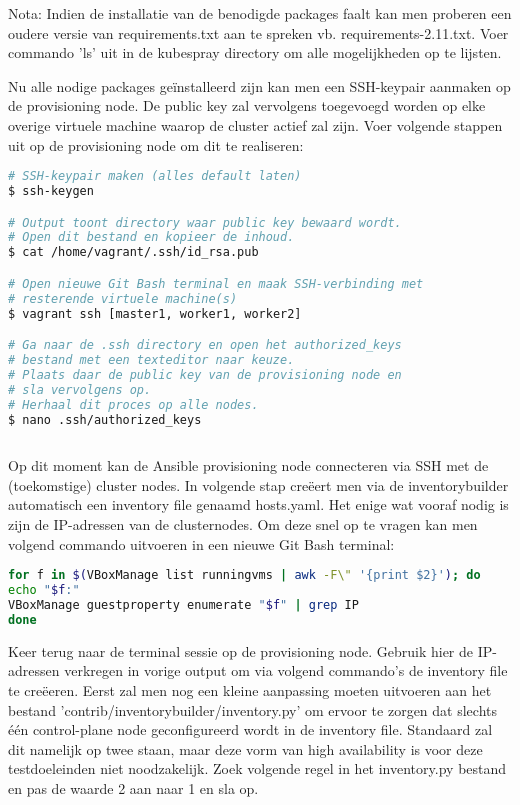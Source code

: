 Nota: Indien de installatie van de benodigde packages faalt kan men proberen een oudere versie van requirements.txt aan te spreken vb. requirements-2.11.txt. Voer commando 'ls' uit in de kubespray directory om alle mogelijkheden op te lijsten.

Nu alle nodige packages geïnstalleerd zijn kan men een SSH-keypair aanmaken op de provisioning node. De public key zal vervolgens toegevoegd worden op elke overige virtuele machine waarop de cluster actief zal zijn. Voer volgende stappen uit op de provisioning node om dit te realiseren:

\begin{lstlisting}[language=bash]
# SSH-keypair maken (alles default laten)
$ ssh-keygen

# Output toont directory waar public key bewaard wordt.
# Open dit bestand en kopieer de inhoud.
$ cat /home/vagrant/.ssh/id_rsa.pub

# Open nieuwe Git Bash terminal en maak SSH-verbinding met 
# resterende virtuele machine(s)
$ vagrant ssh [master1, worker1, worker2]

# Ga naar de .ssh directory en open het authorized_keys 
# bestand met een texteditor naar keuze. 
# Plaats daar de public key van de provisioning node en 
# sla vervolgens op.
# Herhaal dit proces op alle nodes.
$ nano .ssh/authorized_keys
    
\end{lstlisting} 

Op dit moment kan de Ansible provisioning node connecteren via SSH met de (toekomstige) cluster nodes. In volgende stap creëert men via de inventory\textunderscore builder automatisch een inventory file genaamd hosts.yaml. Het enige wat vooraf nodig is zijn de IP-adressen van de clusternodes. Om deze snel op te vragen kan men volgend commando uitvoeren in een nieuwe Git Bash terminal:

\begin{lstlisting}[language=bash] 
for f in $(VBoxManage list runningvms | awk -F\" '{print $2}'); do
echo "$f:"
VBoxManage guestproperty enumerate "$f" | grep IP
done
\end{lstlisting}  

Keer terug naar de terminal sessie op de provisioning node. Gebruik hier de IP-adressen verkregen in vorige output om via volgend commando's de inventory file te creëeren. 
Eerst zal men nog een kleine aanpassing moeten uitvoeren aan het bestand 'contrib/inventory\textunderscore builder/inventory.py' om ervoor te zorgen dat slechts één control-plane node geconfigureerd wordt in de inventory file. Standaard zal dit namelijk op twee staan, maar deze vorm van high availability is voor deze testdoeleinden niet noodzakelijk. 
Zoek volgende regel in het inventory.py bestand en pas de waarde 2 aan naar 1 en sla op.

